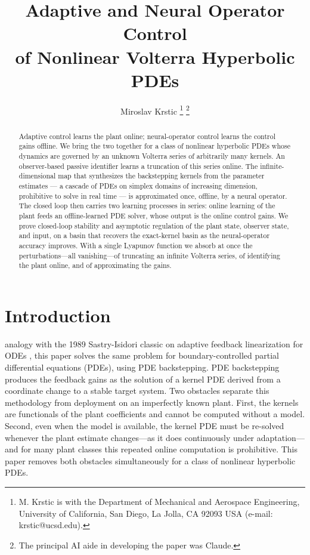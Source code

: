 \documentclass[journal,twoside,web]{ieeecolor}
\begin{document}
\title{Adaptive and Neural Operator Control \\ of Nonlinear Volterra Hyperbolic PDEs}
\author{Miroslav Krstic%
\thanks{M. Krstic is with the Department of Mechanical and Aerospace Engineering, University of California, San Diego, La Jolla, CA 92093 USA (e-mail: krstic@ucsd.edu).}%
\thanks{The principal AI aide in developing the paper was Claude.} }

\maketitle

\begin{abstract}
Adaptive control learns the plant online; neural-operator control learns the control gains offline. We bring the two together for a class of nonlinear hyperbolic PDEs whose dynamics are governed by an unknown Volterra series of arbitrarily many kernels. An observer-based passive identifier learns a truncation of this series online. The infinite-dimensional map that synthesizes the backstepping kernels from the parameter estimates --- a cascade of PDEs on simplex domains of increasing dimension, prohibitive to solve in real time --- is approximated once, offline, by a neural operator. The closed loop then carries two learning processes in series: online learning of the plant feeds an offline-learned PDE solver, whose output is the online control gains. We prove closed-loop stability and asymptotic regulation of the plant state, observer state, and input, on a basin that recovers the exact-kernel basin as the neural-operator accuracy improves. With a single Lyapunov function we absorb at once the perturbations---all vanishing---of truncating an infinite Volterra series, of identifying the plant online, and of approximating the gains. 
\end{abstract}


\section{Introduction}\label{sec:intro}

 analogy with the 1989 Sastry-Isidori classic on adaptive feedback linearization for ODEs \cite{SastryIsidori89}, this paper solves the same problem for boundary-controlled partial differential equations (PDEs), using PDE backstepping. PDE backstepping produces the feedback gains as the solution of a kernel PDE derived from a coordinate change to a stable target system. Two obstacles separate this methodology from deployment on an imperfectly known plant. First, the kernels are functionals of the plant coefficients and cannot be computed without a model. Second, even when the model is available, the kernel PDE must be re-solved whenever the plant estimate changes---as it does continuously under adaptation---and for many plant classes this repeated online computation is prohibitive. This paper removes both obstacles simultaneously for a class of nonlinear hyperbolic PDEs.
\end{document}
